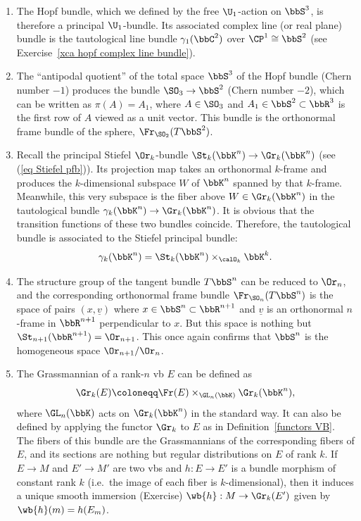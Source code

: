 \begin{example}
\begin{enumerate}
        \item The Hopf bundle, which we defined by the free $\U_1$-action on $\bbS^3$, is therefore a principal $\U_1$-bundle. Its associated complex line (or real plane) bundle is the tautological line bundle $\gamma_1(\bbC^2)$ over $\CP^1\cong\bbS^2$ (see Exercise~\ref{xca hopf complex line bundle}).
        
        \item The ``antipodal quotient'' of the total space $\bbS^3$ of the Hopf bundle (Chern number $-1$) produces the bundle $\SO_3\to \bbS^2$ (Chern number $-2$), which can be written as $\pi(A)=A_1$, where $A\in\SO_3$ and $A_1\in \bbS^2\subset \bbR^3$ is the first row of $A$ viewed as a unit vector. This bundle is the orthonormal frame bundle of the sphere, $\Fr_{\SO_2}(T\bbS^2)$.
        
        \item Recall the principal Stiefel $\Or_k$-bundle $\St_k(\bbK^n)\to \Gr_k(\bbK^n)$ (see (\ref{eq Stiefel pfb})). Its projection map takes an orthonormal $k$-frame and produces the $k$-dimensional subspace $W$ of $\bbK^n$ spanned by that $k$-frame. Meanwhile, this very subspace is the fiber above $W\in \Gr_k(\bbK^n)$ in the tautological bundle $\gamma_k(\bbK^n)\to \Gr_k(\bbK^n)$. It is obvious that the transition functions of these two bundles coincide. Therefore, the tautological bundle is associated to the Stiefel principal bundle:
        \[\gamma_k(\bbK^n)=\St_k(\bbK^n)\times_{\calO_k}\bbK^k.\]

        \item The structure group of the tangent bundle $T\bbS^n$ can be reduced to $\Or_n$, and the corresponding orthonormal frame bundle $\Fr_{\SO_n}(T\bbS^n)$ is the space of pairs $(x,\underline{v})$ where $x\in\bbS^n\subset\bbR^{n+1}$ and $\underline{v}$ is an orthonormal $n$-frame in $\bbR^{n+1}$ perpendicular to $x$. But this space is nothing but $\St_{n+1}(\bbR^{n+1})=\Or_{n+1}$. This once again confirms that $\bbS^n$ is the homogeneous space $\Or_{n+1}\slash \Or_n$.

        \item The Grassmannian of a rank-$n$ \gls{vb} $E$ can be defined as 
        \[\Gr_k(E)\coloneqq \Fr(E)\times_{\GL_n(\bbK)} \Gr_k(\bbK^n),\]
        where $\GL_n(\bbK)$ acts on $\Gr_k(\bbK^n)$ in the standard way. It can also be defined by applying the functor $\Gr_k$ to $E$ as in Definition~\ref{functors VB}. The fibers of this bundle are the Grassmannians of the corresponding fibers of $E$, and its sections are nothing but regular distributions on $E$ of rank $k$.  If $E\to M$ and $E'\to M'$ are two \glspl{vb} and $h:E\to E'$ is a bundle morphism of constant rank $k$ (i.e.\ the image of each fiber is $k$-dimensional), then it induces a unique smooth immersion (Exercise) $\wb{h}:M\to \Gr_k(E')$ given by $\wb{h}(m)=h(E_m)$.
        

\end{enumerate}
\end{example}
